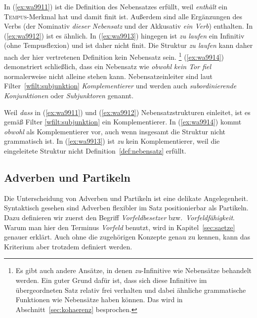 In (\ref{ex:wa9911}) ist die Definition des Nebensatzes erfüllt, weil \textit{enthält} ein \textsc{Tempus}-Merkmal hat und damit finit ist.
Außerdem sind alle Ergänzungen des Verbs (der Nominativ \textit{dieser Nebensatz} und der Akkusativ \textit{ein Verb}) enthalten.
In (\ref{ex:wa9912}) ist es ähnlich.
In (\ref{ex:wa9913}) hingegen ist \textit{zu laufen} ein Infinitiv (ohne Tempusflexion) und ist daher nicht finit.
Die Struktur \textit{zu laufen} kann daher nach der hier vertretenen Definition kein Nebensatz sein.%
\footnote{Es gibt auch andere Ansätze, in denen \textit{zu}-Infinitive wie Nebensätze behandelt werden.
Ein guter Grund dafür ist, dass sich diese Infinitive im übergeordneten Satz relativ frei verhalten und dabei ähnliche grammatische Funktionen wie Nebensätze haben können.
Das wird in Abschnitt~\ref{sec:kohaerenz} besprochen.}
(\ref{ex:wa9914}) demonstriert schließlich, dass ein Nebensatz wie \textit{obwohl kein Tor fiel} normalerweise nicht alleine stehen kann.
Nebensatzeinleiter sind laut Filter~\ref{wfilt:subjunktion} \textit{Komplementierer} und werden auch \textit{subordinierende Konjunktionen} oder \textit{Subjunktoren} genannt.


Weil \textit{dass} in (\ref{ex:wa9911}) und (\ref{ex:wa9912}) Nebensatzstrukturen einleitet, ist es gemäß Filter \ref{wfilt:subjunktion} ein Komplementierer.
In (\ref{ex:wa9914}) kommt \textit{obwohl} als Komplementierer vor, auch wenn insgesamt die Struktur nicht grammatisch ist.
In (\ref{ex:wa9913}) ist \textit{zu} kein Komplementierer, weil die eingeleitete Struktur nicht Definition~\ref{def:nebensatz} erfüllt.

\subsection{Adverben und Partikeln}

\label{sec:adverbenpartikelnwortklassen}


Die Unterscheidung von Adverben und Partikeln ist eine delikate Angelegenheit.
Syntaktisch gesehen sind Adverben flexibler im Satz positionierbar als Partikeln. 
Dazu definieren wir zuerst den Begriff \textit{Vorfeldbesetzer} bzw.\ \textit{Vorfeldfähigkeit}.
Warum man hier den Terminus \textit{Vorfeld} benutzt, wird in Kapitel~\ref{sec:saetze} genauer erklärt.
Auch ohne die zugehörigen Konzepte genau zu kennen, kann das Kriterium aber trotzdem definiert werden.

